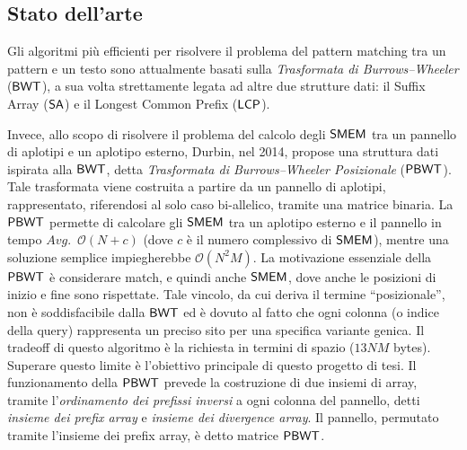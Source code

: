 \documentclass[a4paper,11pt, oneside,italian]{article}
\def\SA{\mbox{\rm {\sf SA}}}
\def\LCP{\mbox{\rm {\sf LCP}}}
\def\LCP{\mbox{\rm {\sf LCP}}}
\def\BWT{\mbox{\rm {\sf BWT}}}
\def\PBWT{\mbox{\rm {\sf PBWT}}}
\def\SMEM{\mbox{\rm {\sf SMEM}}}
\begin{document}
\subsection*{Stato dell'arte}
Gli algoritmi più efficienti per risolvere il problema del pattern matching tra
un pattern e un testo 
sono attualmente basati sulla \emph{Trasformata di Burrows--Wheeler} ($\BWT$), a
sua 
volta strettamente legata ad altre due strutture dati: il Suffix Array ($\SA$) e
il Longest Common Prefix ($\LCP$). 

Invece, allo scopo di risolvere il problema del calcolo degli $\SMEM$ tra un
pannello di aplotipi e un aplotipo esterno,
Durbin, nel 2014, propose una struttura dati ispirata alla $\BWT$, detta
\textit{Trasformata di Burrows--Wheeler Posizionale} ($\PBWT$). Tale trasformata
viene costruita a partire da un pannello di aplotipi, rappresentato, riferendosi
al solo caso bi-allelico, tramite una matrice binaria.
La $\PBWT$ permette di calcolare gli $\SMEM$ tra
un aplotipo esterno e il pannello in tempo $Avg.\,\,\,\mathcal{O}(N+c)$ (dove 
$c$ è il numero complessivo di $\SMEM$), mentre 
una soluzione semplice impiegherebbe $\mathcal{O}(N^2M)$.
La motivazione essenziale della $\PBWT$ è considerare match, e quindi anche
$\SMEM$, 
dove anche le posizioni di inizio e fine sono rispettate.
Tale vincolo, da cui deriva il termine
``posizionale'', non è soddisfacibile dalla $\BWT$ ed è dovuto al fatto che ogni 
colonna (o indice della query) rappresenta un preciso sito per una specifica
variante genica. Il tradeoff di questo algoritmo è la richiesta in termini di
spazio ($13NM$ 
bytes). Superare questo limite è l'obiettivo principale di
questo progetto di tesi.
Il funzionamento della $\PBWT$ prevede la costruzione di due insiemi di
array, tramite 
l'\textit{ordinamento dei prefissi inversi} a ogni colonna del pannello, detti
\textit{insieme dei prefix array} e \textit{insieme dei divergence array}.
Il pannello, permutato tramite l'insieme dei prefix array, è
detto matrice $\PBWT$.
\end{document}
